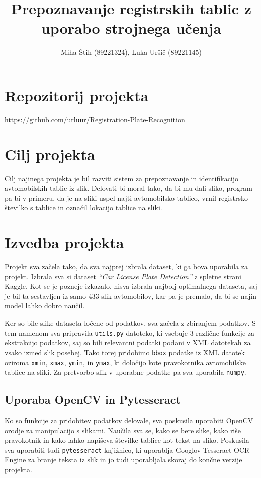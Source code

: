 \documentclass[a4paper,12pt]{article}
\title{Prepoznavanje registrskih tablic z uporabo strojnega učenja}
\author{Miha Štih (89221324), Luka Uršič (89221145)}
\date{}
\begin{document}
\maketitle

\section*{Repozitorij projekta}
\url{https://github.com/urluur/Registration-Plate-Recognition}

\section*{Cilj projekta}
Cilj najinega projekta je bil razviti sistem za prepoznavanje in identifikacijo avtomobilskih tablic iz slik. Delovati bi moral tako, da bi mu dali sliko, program pa bi v primeru, da je na sliki uspel najti avtomobilsko tablico, vrnil registrsko številko s tablice in označil lokacijo tablice na sliki.

\section*{Izvedba projekta}
Projekt sva začela tako, da sva najprej izbrala dataset, ki ga bova uporabila za projekt. Izbrala sva si dataset \textit{“Car License Plate Detection”} z spletne strani Kaggle. Kot se je pozneje izkazalo, nisva izbrala najbolj optimalnega dataseta, saj je bil ta sestavljen iz samo 433 slik avtomobilov, kar pa je premalo, da bi se najin model lahko dobro naučil.

Ker so bile slike dataseta ločene od podatkov, sva začela z zbiranjem podatkov. S tem namenom sva pripravila \texttt{utils.py} datoteko, ki vsebuje 3 različne funkcije za ekstrakcijo podatkov, saj so bili relevantni podatki podani v XML datotekah za vsako izmed slik posebej. Tako torej pridobimo \texttt{bbox} podatke iz XML datotek oziroma \texttt{xmin}, \texttt{xmax}, \texttt{ymin}, in \texttt{ymax}, ki določijo kote pravokotnika avtomobilske tablice na sliki. Za pretvorbo slik v uporabne podatke pa sva uporabila \texttt{numpy}.

\subsection*{Uporaba OpenCV in Pytesseract}
Ko so funkcije za pridobitev podatkov delovale, sva poskusila uporabiti OpenCV orodje za manipulacijo s slikami. Naučila sva se, kako se bere slike, kako riše pravokotnik in kako lahko napiševa številke tablice kot tekst na sliko. Poskusila sva uporabiti tudi \texttt{pytesseract} knjižnico, ki uporablja Googlov Tesseract OCR Engine za branje teksta iz slik in jo tudi uporabljala skoraj do končne verzije projekta.
\end{document}
